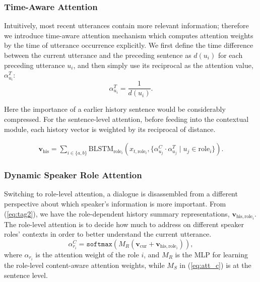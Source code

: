 \documentclass{article}
\begin{document}
\subsubsection{Time-Aware Attention}
Intuitively, most recent utterances contain more relevant information; therefore we introduce time-aware attention mechanism which computes attention weights by the time of utterance occurrence explicitly.
We first define the time difference between the current utterance and the preceding sentence as $d(u_i)$ for each preceding utterance $u_i$, and then simply use its reciprocal as the attention value, $\alpha^T_{u_i}$:
\begin{equation}
\alpha^T_{u_i} = \frac{1}{d(u_i)}.
\end{equation}

Here the importance of a earlier history sentence would be considerably compressed.
For the sentence-level attention, before feeding into the contextual module, each history vector is weighted by its reciprocal of distance.


\begin{eqnarray}
\textbf{v}_\text{his} = \sum_{i\in \{a,b\}} \text{BLSTM}_{\text{role}_i}(x_{t,\text{role}_i}, \{ \alpha^C_{u_j}\cdot \alpha^T_{u_j} \mid u_j \in \text{role}_i\}).
\end{eqnarray}


\subsubsection{Dynamic Speaker Role Attention}

Switching to role-level attention, a dialogue is disassembled from a different perspective about which speaker's information is more important.
From (\ref{eq:tag2}), we have the role-dependent history summary representations, $\textbf{v}_{\text{his}, \text{role}_i}$. 
The role-level attention is to decide how much to address on different speaker roles' contexts in order to better understand the current utterance.
\begin{equation}
\alpha^C_{r_i} = \mathtt{softmax}(M_R(\textbf{v}_\text{cur} + \textbf{v}_{\text{his}, \text{role}_i})), 
\end{equation}
where $\alpha_{r_i}$ is the attention weight of the role $i$, and $M_R$ is the MLP for learning the role-level content-aware attention weights, while $M_S$ in (\ref{eq:att_c}) is at the sentence level.
\end{document}
